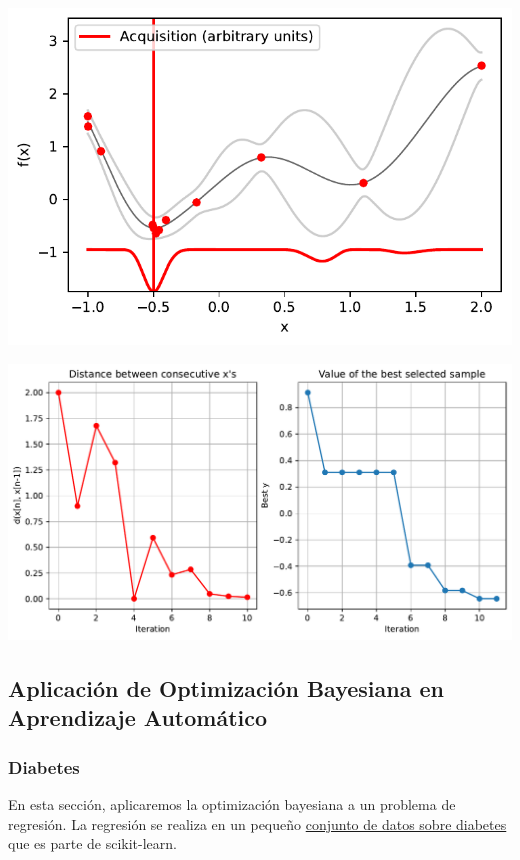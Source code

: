 \documentclass[
  12pt,
  letterpaper,
  DIV=11,
  numbers=noendperiod]{scrartcl}
\begin{document}
\includegraphics{ProyFinal_OptBayesiana_2024_y_files/figure-pdf/cell-10-output-1.pdf}

\includegraphics{ProyFinal_OptBayesiana_2024_y_files/figure-pdf/cell-11-output-1.pdf}

\subsection{Aplicación de Optimización Bayesiana en Aprendizaje
Automático}\label{aplicaciuxf3n-de-optimizaciuxf3n-bayesiana-en-aprendizaje-automuxe1tico}

\subsubsection{Diabetes}\label{diabetes}

En esta sección, aplicaremos la optimización bayesiana a un problema de
regresión. La regresión se realiza en un pequeño
\href{http://scikit-learn.org/stable/modules/generated/sklearn.datasets.load_diabetes.html\#sklearn.datasets.load_diabetes}{conjunto
de datos sobre diabetes} que es parte de scikit-learn.
\end{document}
